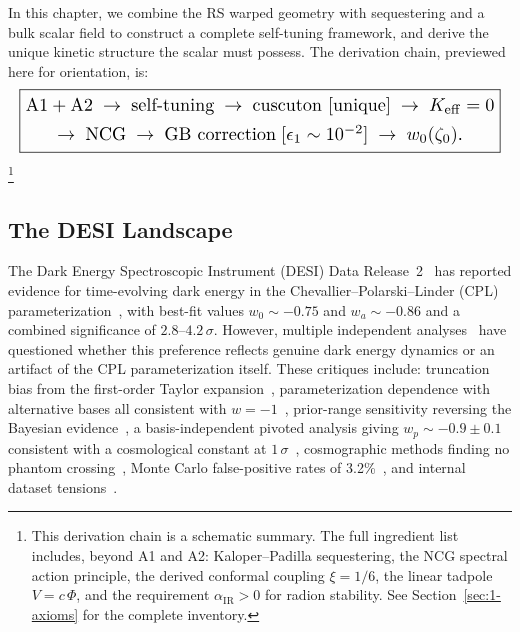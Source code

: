 In this chapter, we combine the RS warped geometry with sequestering and a bulk scalar field to construct a complete self-tuning framework, and derive the unique kinetic structure the scalar must possess. The derivation chain, previewed here for orientation, is:
\begin{equation}
\label{eq:1-chain}
\resizebox{\columnwidth}{!}{$\displaystyle\boxed{
\begin{array}{@{}c@{}}
\mathrm{A1 + A2} \;\to\; \text{self-tuning} \;\to\; \text{cuscuton [unique]} \;\to\; \Keff = 0 \\[4pt]
\to\; \text{NCG} \;\to\; \text{GB correction}\;[\eps \sim 10^{-2}] \;\to\; \wz(\zz).
\end{array}
}$}
\end{equation}%
\footnote{This derivation chain is a schematic summary. The full ingredient list includes, beyond A1 and A2: Kaloper--Padilla sequestering, the NCG spectral action principle, the derived conformal coupling $\xi = 1/6$, the linear tadpole $V = c\,\Phi$, and the requirement $\alpha_{\mathrm{IR}} > 0$ for radion stability. See Section~\ref{sec:1-axioms} for the complete inventory.}

\subsection{The DESI Landscape}
\label{sec:1-desi}

The Dark Energy Spectroscopic Instrument (DESI) Data Release~2~\cite{ch1:desi25} has reported evidence for time-evolving dark energy in the Chevallier--Polarski--Linder (CPL) parameterization~\cite{ch1:chevallier01,ch1:linder03}, with best-fit values $w_0 \sim -0.75$ and $w_a \sim -0.86$ and a combined significance of $2.8$--$4.2\,\sigma$. However, multiple independent analyses~\cite{ch1:nesseris25,ch1:gomez25,ch1:lodha24,ch1:hasan25,ch1:mandal25,ch1:andrianomena25,ch1:marques25} have questioned whether this preference reflects genuine dark energy dynamics or an artifact of the CPL parameterization itself. These critiques include: truncation bias from the first-order Taylor expansion~\cite{ch1:nesseris25}, parameterization dependence with alternative bases all consistent with $w = -1$~\cite{ch1:gomez25}, prior-range sensitivity reversing the Bayesian evidence~\cite{ch1:lodha24}, a basis-independent pivoted analysis giving $w_p \sim -0.9 \pm 0.1$ consistent with a cosmological constant at $1\,\sigma$~\cite{ch1:hasan25}, cosmographic methods finding no phantom crossing~\cite{ch1:mandal25}, Monte Carlo false-positive rates of 3.2\%~\cite{ch1:andrianomena25}, and internal dataset tensions~\cite{ch1:marques25}.

